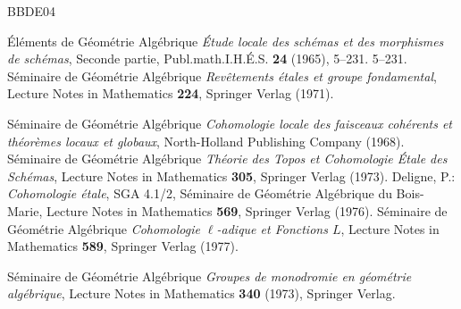\documentclass[12pt]{amsart}
\theoremstyle{plain}
\theoremstyle{definition}
\numberwithin{thm}{section}
\numberwithin{equation}{section}
\begin{document}
\begin{thebibliography}{BBDE04}
 

 \'El\'ements de G\'eom\'etrie Alg\'ebrique {\it  \'Etude locale des sch\'emas et des morphismes de sch\'emas}, Seconde partie, Publ.math.I.H.\'E.S. {\bf 24} (1965), 5--231.
5--231.
 S\'eminaire de G\'eom\'etrie Alg\'ebrique {\it Rev\^etements \'etales et groupe fondamental},  Lecture Notes in Mathematics {\bf 224}, Springer Verlag (1971).

 S\'eminaire de G\'eom\'etrie Alg\'ebrique {\it Cohomologie locale des faisceaux coh\'erents et th\'eor\`emes locaux et globaux}, 
North-Holland Publishing Company (1968).
 S\'eminaire de G\'eom\'etrie Alg\'ebrique {\it Th\'eorie des Topos et Cohomologie \'Etale des Sch\'emas},   Lecture Notes in Mathematics {\bf 305}, Springer Verlag (1973). 
 Deligne, P.: {\it    Cohomologie \'etale}, SGA 4.1/2, S\'eminaire de G\'eom\'etrie Alg\'ebrique du Bois-Marie, Lecture Notes in Mathematics {\bf 569}, Springer Verlag (1976).
 S\'eminaire de G\'eom\'etrie Alg\'ebrique  {\it Cohomologie $\ell$-adique et Fonctions $L$}, Lecture Notes in Mathematics {\bf 589}, Springer Verlag (1977).

  S\'eminaire de G\'eom\'etrie Alg\'ebrique {\it Groupes de monodromie en g\'eom\'etrie alg\'ebrique}, Lecture Notes in Mathematics {\bf 340} (1973), Springer Verlag.
 \end{thebibliography}
\end{document}
